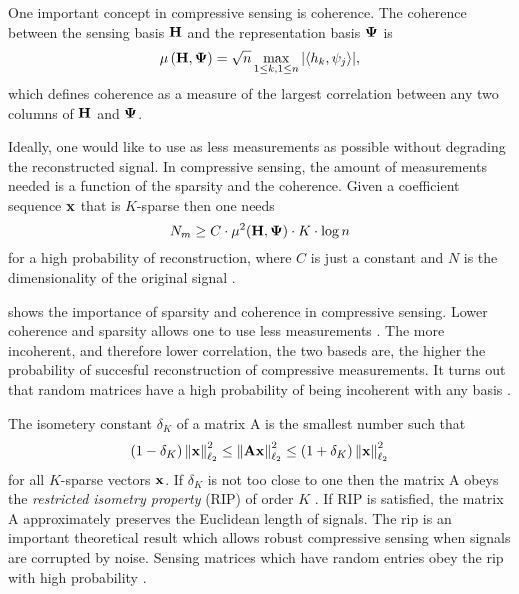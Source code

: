 One important concept in \gls{compressive sensing} is coherence. The coherence between the sensing basis $\mathbf{H}$ and the representation basis $\mathbf{\Psi}$ is
\begin{equation}
	\mu \left( \mathbf{H}, \mathbf{\Psi} \right) = \sqrt{n} \max_{1 \leq k, 1 \leq n}  | \langle h_k, \psi_j \rangle | ,
	\label{eq:coherenceDef1}
\end{equation}
which defines coherence as a measure of the largest correlation between any two columns of $\mathbf{H}$ and $\mathbf{\Psi}$. 

Ideally, one would like to use as less measurements as possible without degrading the reconstructed signal. In \gls{compressive sensing}, the amount of measurements needed is a function of the sparsity and the coherence. Given a coefficient sequence $\mathbf{x}$ that is $K$-sparse then one needs
\begin{equation}
N_m \geq C \cdot \mu^2 ( \mathbf{H} , \mathbf{\Psi} ) \cdot K \cdot \log n
\label{eq:minMeas1}
\end{equation}
for a high probability of reconstruction, where $C$ is just a constant and $N$ is the dimensionality of the original signal \cite{candes2008introduction}.

 shows the importance of sparsity and coherence in compressive sensing. Lower coherence and sparsity allows one to use less measurements \cite{duarte2008single}. The more incoherent, and therefore lower correlation, the two baseds are, the higher the probability of succesful reconstruction of compressive measurements. It turns out that random matrices have a high probability of being incoherent with any basis \cite{candes2008introduction}. 

The isometery constant $\delta_K$ of a matrix \gls{A} is the smallest number such that 
\begin{equation}
	\left( 1 - \delta_K \right) \left\| \mathbf{x} \right\|_{\ell_2}^{2} \leq \left\| \mathbf{A} \mathbf{x} \right\|_{\ell_2}^{2} \leq \left( 1 + \delta_K \right) \left\| \mathbf{x} \right\|_{\ell_2}^{2} 
\label{eq:rip}
\end{equation}
for all $K$-sparse vectors $\mathbf{x}$. If $\delta_K$ is not too close to one then the matrix \gls{A} obeys the \emph{restricted isometry property} (RIP) of order $K$ \cite{candes2008introduction}. If RIP is satisfied, the matrix \gls{A} approximately preserves the Euclidean length of signals. The \gls{rip} is an important theoretical result which allows robust compressive sensing when signals are corrupted by noise. Sensing matrices which have random entries obey the \gls{rip} with high probability \cite{candes2008introduction, duarte2008single, foucart2013mathematical}. 

